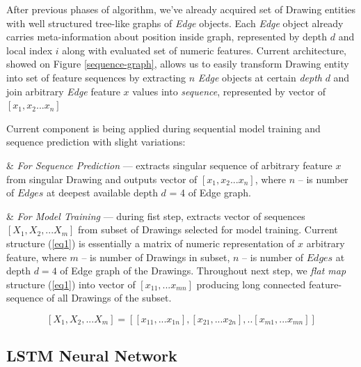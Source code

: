 After previous phases of algorithm, we've already acquired set of Drawing entities with well structured tree-like graphs of \textit{Edge} objects. Each \textit{Edge} object already carries meta-information about position inside graph, represented by depth $d$ and local index $i$ along with evaluated set of numeric features. 
Current architecture, showed on Figure \ref{sequence-graph}, allows us to easily transform Drawing entity into set of feature sequences by extracting $n$ \textit{Edge} objects at certain \textit{depth} $d$ and join arbitrary \textit{Edge} feature $x$ values into \textit{sequence}, represented by vector of $[x_1, x_2...x_n]$

Current component is being applied during sequential model training and sequence prediction with slight variations:

\begin{easylist}[itemize]
& \textit{For Sequence Prediction} --- extracts singular sequence of arbitrary feature $x$ from singular Drawing and outputs vector of $[x_1, x_2...x_n]$, where $n$ -- is number of $Edges$ at deepest available depth $d$ = 4 of Edge graph.

& \textit{For Model Training} --- during fist step, extracts vector of sequences $[X_1, X_2, ...X_m]$ from subset of Drawings selected for model training. Current structure (\ref{eq1}) is essentially a matrix of numeric representation of $x$ arbitrary feature, where $m$ -- is number of Drawings in subset, $n$ -- is number of $Edges$ at depth $d = 4$ of Edge graph of the Drawings. Throughout next step, we \textit{flat map} structure (\ref{eq1}) into vector of $[x_{11}, ...x_{mn}]$ producing long connected feature-sequence of all Drawings of the subset. 

\begin{equation} \label{eq1}
    [X_1, X_2, ...X_m] = [[x_{11}, ...x_{1n}], [x_{21}, ...x_{2n}], ..[x_{m1}, ... x_{mn}]]
\end{equation}

\end{easylist}

\subsection{LSTM Neural Network}


